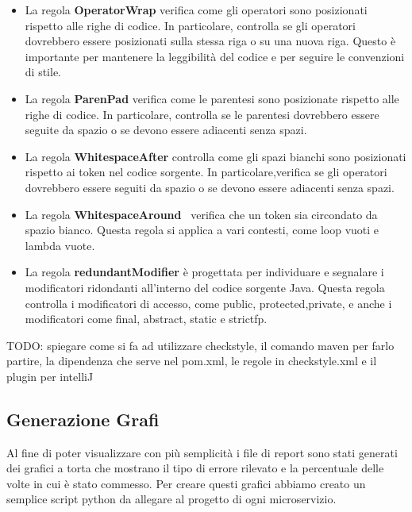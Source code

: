 \begin{itemize}
		\item La regola \textbf{\textbf{OperatorWrap}} verifica come gli operatori sono posizionati rispetto alle righe di codice. In particolare, controlla se gli operatori dovrebbero essere posizionati sulla stessa riga o su una nuova riga. Questo è importante per mantenere la leggibilità del codice e per seguire le convenzioni di stile.

		\item La regola \textbf{\textbf{ParenPad}} verifica come le parentesi sono posizionate rispetto alle righe di codice. In particolare, controlla se le parentesi dovrebbero essere seguite da spazio o se devono essere adiacenti senza spazi.

		\item La regola \textbf{\textbf{WhitespaceAfter}} controlla come gli spazi bianchi sono posizionati rispetto ai token nel codice sorgente. In particolare,verifica se gli operatori dovrebbero essere seguiti da spazio o se devono essere adiacenti senza spazi.

		\item La regola \textbf{\textbf{WhitespaceAround}}  verifica che un token sia circondato da spazio bianco. Questa regola si applica a vari contesti, come loop vuoti e lambda vuote.

		\item La regola \textbf{\textbf{redundantModifier}} è progettata per individuare e segnalare i modificatori ridondanti all'interno del codice sorgente Java. Questa regola controlla i modificatori di accesso, come public, protected,private, e anche i modificatori come final, abstract, static e strictfp.

	\end{itemize}

TODO: spiegare come si fa ad utilizzare checkstyle, il comando maven per farlo partire, la dipendenza che serve nel pom.xml, le regole in checkstyle.xml e il plugin per intelliJ 

\subsection{Generazione Grafi}
Al fine di poter visualizzare con più semplicità i file di report sono stati generati dei grafici a torta che mostrano il tipo di errore rilevato e la percentuale delle volte in cui è stato commesso.
Per creare questi grafici abbiamo creato un semplice script python da allegare al progetto di ogni microservizio. 

